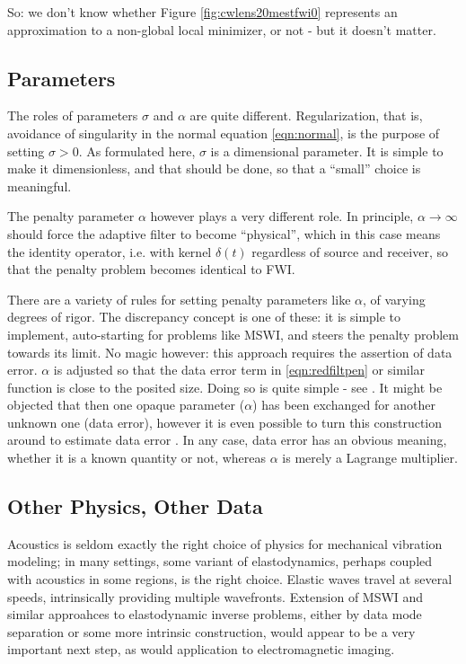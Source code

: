 So: we don't know whether Figure \ref{fig:cwlens20mestfwi0} represents an
approximation to a non-global local minimizer, or not - but it doesn't matter.

\subsection{Parameters}
The roles of parameters $\sigma$ and $\alpha$ are quite
different. Regularization, that is, avoidance of singularity in the
normal equation \ref{eqn:normal}, is the purpose of setting $\sigma >
0$. As formulated here, $\sigma$ is a dimensional parameter. It is
simple to make it dimensionless, and that should be done, so that a
``small'' choice is meaningful.

The penalty parameter $\alpha$ however plays a very different role. In
principle, $\alpha \rightarrow \infty$ should force the adaptive
filter to become ``physical'', which in this case means the identity
operator, i.e. with kernel $\delta(t)$ regardless of source and
receiver, so that the penalty problem becomes identical to FWI.

There are a variety of rules for setting penalty parameters like
$\alpha$, of varying degrees of rigor. The discrepancy concept is one
of these: it is simple to implement, auto-starting for problems like
MSWI, and steers the penalty problem towards its limit. No magic
however: this approach requires the assertion of data error. $\alpha$
is adjusted so that the data error term in \ref{eqn:redfiltpen} or
similar function is close to the posited size. Doing so is quite
simple - see \cite{Fu:Geo17b,SymesMinkoffChen:IP22}. It might be objected that
then one opaque parameter ($\alpha$) has been exchanged for another
unknown one (data error), however it is even possible to turn this
construction around to estimate data error
\cite[]{ChenSymesMinkoff:IMAGE22}. In any case, data error has an
obvious meaning, whether it is a known quantity or not, whereas
$\alpha$ is merely a Lagrange multiplier.

\subsection{Other Physics, Other Data}
Acoustics is seldom exactly the right choice of physics for mechanical
vibration modeling; in many settings, some variant of elastodynamics,
perhaps coupled with acoustics in some regions, is the right
choice. Elastic waves travel at several speeds, intrinsically
providing multiple wavefronts. Extension of MSWI and similar
approahces to elastodynamic inverse problems, either by data mode
separation or some more intrinsic construction, would appear to be a
very important next step, as would application to electromagnetic imaging.

